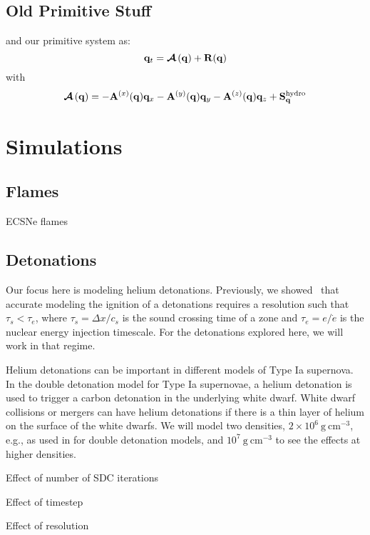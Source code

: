\documentclass[times,modern]{aastex62}
\newcommand{\gcc}{\mathrm{g~cm^{-3} }}
\newcommand{\xv}{{(x)}}
\newcommand{\yv}{{(y)}}
\newcommand{\zv}{{(z)}}
\newcommand{\Ab}{{\bf A}}
\newcommand{\Sq}{{\bf S}_\qb}
\newcommand{\Sqhydro}{{\Sq^{\mathrm{hydro}}}}
\newcommand{\qb}{{\bf q}}
\newcommand{\Rb}{{\bf R}}
\newcommand{\Advs}[1]{\boldsymbol{\mathcal{A}} \left(#1\right)}
\begin{document}
\subsection{Old Primitive Stuff}


and our primitive system as:
\begin{equation}
\qb_t = \Advs{\qb} + \Rb(\qb)
\end{equation}
with
\begin{equation}
\Advs{\qb} = -\Ab^\xv(\qb) \qb_x - \Ab^\yv(\qb) \qb_y - \Ab^\zv(\qb) \qb_z + \Sqhydro
\end{equation}



\section{Simulations}

\subsection{Flames}

ECSNe flames

\subsection{Detonations}

Our focus here is modeling helium detonations.  Previously, we
showed~\cite{katzzingale:2019} that accurate modeling the ignition of
a detonations requires a resolution such that $\tau_s < \tau_e$, where
$\tau_s = \Delta x/c_s$ is the sound crossing time of a zone and
$\tau_e = e/\dot{e}$ is the nuclear energy injection timescale.  For
the detonations explored here, we will work in that regime.

Helium detonations can be important in different models of Type Ia
supernova.  In the double detonation model for Type Ia supernovae, a
helium detonation is used to trigger a carbon detonation in the
underlying white dwarf.  White dwarf collisions or mergers can have
helium detonations if there is a thin layer of helium on the surface
of the white dwarfs.  We will model two densities, $2\times
10^6~\gcc$, e.g., as used in \citet{glasner:2018} for double
detonation models, and $10^7~\gcc$ to see the effects at higher
densities.

Effect of number of SDC iterations

Effect of timestep

Effect of resolution
\end{document}
